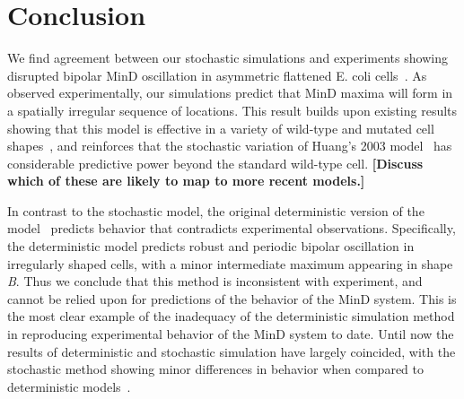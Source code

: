 \documentclass[10pt,letterpaper]{article}
\newcommand{\red}[1]{{\bf \color{red} #1}}
\newcommand{\fixme}[1]{\red{[#1]}}
\begin{document}
\section*{Conclusion}
We find agreement between our stochastic simulations and experiments
showing disrupted bipolar MinD oscillation in asymmetric flattened
E. coli cells~\cite{mannik2012robustness}.  As observed
experimentally, our simulations predict that MinD maxima will form in
a spatially irregular sequence of locations.  This result builds upon
existing results showing that this model is effective in a variety of
wild-type and mutated cell shapes~\cite{fange2006noise, varma2008min,
  kruse2007experimentalist}, and reinforces that the stochastic
variation of Huang's 2003 model~\cite{fange2006noise,
  kerr2006division} has considerable predictive power beyond the
standard wild-type cell.  \fixme{Discuss which of these are likely to
  map to more recent models.}


%

In contrast to the stochastic model, the original deterministic
version of the model~\cite{huang2003dynamic} predicts behavior that
contradicts experimental observations.  Specifically, the
deterministic model predicts robust and periodic bipolar oscillation
in irregularly shaped cells, with a minor intermediate maximum
appearing in shape \emph{B}.  Thus we conclude that this method is
inconsistent with experiment, and cannot be relied upon for
predictions of the behavior of the MinD system.  This is the most
clear example of the inadequacy of the deterministic simulation method
in reproducing experimental behavior of the MinD system to date.
Until now the results of deterministic and stochastic simulation have
largely coincided, with the stochastic method showing minor
differences in behavior when compared to deterministic
models~\cite{kerr2006division, fange2006noise, huang2004min,
  kruse2007experimentalist}.
\end{document}
